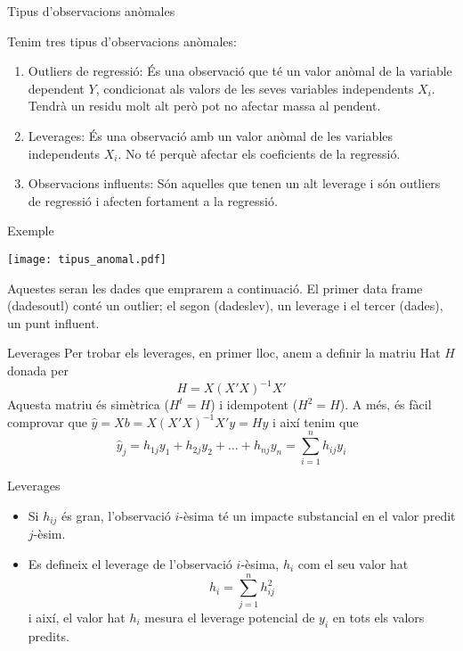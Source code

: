 \documentclass[12pt,t]{beamer}
\renewcommand{\emph}[1]{{\color{red}#1}}
\theoremstyle{plain}
\theoremstyle{definition}
\begin{document}
\begin{frame}{Tipus d'observacions anòmales}

Tenim tres tipus d'observacions anòmales:
\begin{enumerate}
\item \emph{Outliers de regressió}: És una observació que té un valor anòmal de la variable dependent $Y$, condicionat als valors de les seves variables independents $X_i$. Tendrà un residu molt alt però pot no afectar massa al pendent.
\item \emph{Leverages}: És una observació amb un valor anòmal de les variables independents $X_i$. No té perquè afectar els coeficients de la regressió.
\item \emph{Observacions influents}: Són aquelles que tenen un alt leverage i són outliers de regressió i afecten fortament a la regressió.

\end{enumerate}

\end{frame}

\begin{frame}{Exemple}

\begin{center}
\texttt{[image: tipus\_anomal.pdf]}
\end{center}
Aquestes seran les dades que emprarem a continuació. El primer data frame (dadesoutl) conté un outlier; el segon (dadeslev), un leverage i el tercer (dades), un punt influent.
\end{frame}

\begin{frame}{Leverages}
Per trobar els leverages, en primer lloc, anem a definir la \emph{ matriu Hat} $H$ donada per
$$H=X(X'X)^{-1}X'$$
Aquesta matriu és simètrica ($H^t=H$) i idempotent ($H^2=H$). A	més, és fàcil comprovar que $\hat{y}=Xb=X(X'X)^{-1}X'y=Hy$ i així tenim que
$$\hat{y}_{j}=h_{1j}y_1+h_{2j}y_2+\ldots+h_{nj}y_n=\sum_{i=1}^n{h_{ij}y_i}$$
\end{frame}

\begin{frame}{Leverages}

\begin{itemize}
\item Si $h_{ij}$ és gran, l'observació $i$-èsima té un impacte substancial en el valor predit $j$-èsim.
\medskip
\item Es defineix el \emph{leverage} de l'observació $i$-èsima, $h_i$ com el seu valor hat
$$h_i=\sum_{j=1}^n{h_{ij}^2}$$
i així, el valor hat $h_i$ mesura el leverage potencial de $y_i$ en tots els valors predits.
\end{itemize}

\end{frame}
\end{document}
